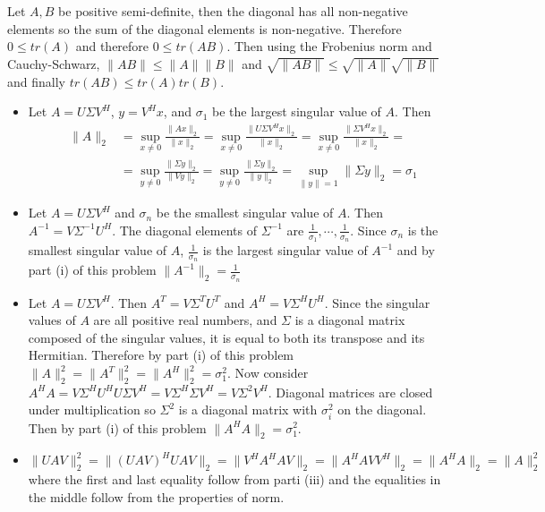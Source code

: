 \documentclass[12pt]{article}
\newenvironment{problem}[2][Problem]{\begin{trivlist}
\item[\hskip \labelsep {\bfseries #1}\hskip \labelsep {\bfseries #2}]}{\end{trivlist}}
\begin{document}
 
\begin{problem}{28.} 
Let $A,B$ be positive semi-definite, then the diagonal has all non-negative elements so the sum of the diagonal elements is non-negative. Therefore $ 0 \leq tr(A)$ and therefore $ 0 \leq tr(AB)$. Then using the Frobenius norm and Cauchy-Schwarz, $\|AB\| \leq \|A\| \|B\|$ and $\sqrt{\|AB\|} \leq \sqrt{\|A\|} \sqrt{\|B\|}$ and finally $tr(AB) \leq tr(A) tr(B)$. 
\end{problem}


\begin{problem}{31.} \hfill
\begin{itemize}
\item [(i)] Let $A = U\Sigma V^H$, $y = V^Hx$, and $\sigma_1$ be the largest singular value of $A$. Then 
\begin{equation*}
\begin{aligned}
\|A\|_2 &= \sup_{x\neq 0} \frac{\|Ax\|_2}{\|x\|_2} = \sup_{x\neq 0} \frac{\|U\Sigma V^Hx\|_2}{\|x\|_2} = \sup_{x\neq 0} \frac{\|\Sigma V^Hx\|_2}{\|x\|_2} = \\
& = \sup_{y\neq 0} \frac{\|\Sigma y\|_2}{\|Vy\|_2} = \sup_{y\neq 0} \frac{\|\Sigma y\|_2}{\|y\|_2} =  \sup_{\|y\|= 1} \|\Sigma y\|_2 = \sigma_1
\end{aligned}
\end{equation*} 
\item [(ii)] Let $A = U\Sigma V^H$ and $\sigma_n$ be the smallest singular value of $A$. Then $A^{-1} = V\Sigma^{-1} U^H$. The diagonal elements of $\Sigma^{-1}$ are $\frac{1}{\sigma_1}, \cdots, \frac{1}{\sigma_n}$. Since $\sigma_n$ is the smallest singular value of $A$, $\frac{1}{\sigma_n}$ is the largest singular value of $A^{-1}$ and by part (i) of this problem $\|A^{-1}\|_2 = \frac{1}{\sigma_n}$
\item [(iii)] Let $A = U\Sigma V^H$. Then $A^T = V\Sigma^T U^T$ and $A^H = V\Sigma^H U^H$. Since the singular values of $A$ are all positive real numbers, and $\Sigma$ is a diagonal matrix composed of the singular values, it is equal to both its transpose and its Hermitian. Therefore by part (i) of this problem $\|A\|_2^2 = \|A^T\|_2^2 = \|A^H\|_2^2 = \sigma_1^2$.  Now consider $A^HA = V\Sigma^H U^HU\Sigma V^H = V\Sigma^H\Sigma V^H = V\Sigma^2V^H$. Diagonal matrices are closed under multiplication so $\Sigma^2$ is a diagonal matrix with $\sigma_i^2$ on the diagonal. Then by part (i) of this problem $\|A^HA\|_2 = \sigma_1^2$. 
\item [(iv)] $\|UAV\|^2_2 = \|(UAV)^HUAV\|_2 = \|V^HA^HAV\|_2 =  \|A^HAVV^H\|_2 = \|A^HA\|_2 = \|A\|^2_2$ where the first and last equality follow from parti (iii) and the equalities in the middle follow from the properties of norm. 
\end{itemize}
\end{problem}
\end{document}
